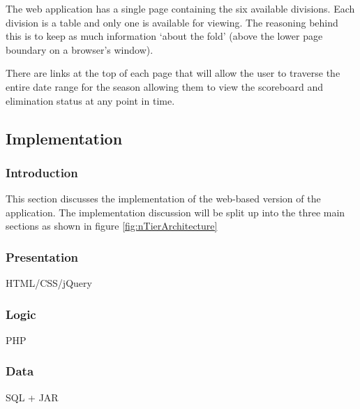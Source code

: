 The web application has a single page containing the six available divisions.
Each division is a table and only one is available for viewing. The reasoning
behind this is to keep as much information `about the fold' (above the lower
page boundary on a browser's window).

There are links at the top of each page that will allow the user to traverse
the entire date range for the season allowing them to view the scoreboard and
elimination status at any point in time.

\subsection{Implementation}

\subsubsection{Introduction}

This section discusses the implementation of the web-based version of the
application. The implementation discussion will be split up into the three
main sections as shown in figure \ref{fig:nTierArchitecture}

\subsubsection{Presentation}

HTML/CSS/jQuery

\subsubsection{Logic}

PHP

\subsubsection{Data}

SQL + JAR
